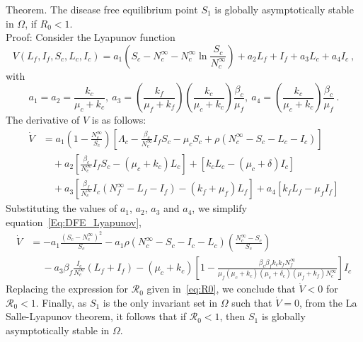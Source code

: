 \documentclass[preprint,12pt]{elsarticle}
\begin{document}
\noindent Theorem. The disease free equilibrium point $S_1$ is globally asymptotically stable in $\Omega$, if $R_0<1$.\\
Proof: Consider the Lyapunov function
$$V(L_f,I_f,S_c,L_c,I_c) = a_1\left(S_c - N_{c}^{\infty} - N_{c}^{\infty}\ln{\frac{S_c}{N_{c}^{\infty}}}\right) + a_2 L_f + I_f + a_3 L_c + a_4 I_c~,$$
with
$$
a_1 = a_2 = \frac{k_c}{\mu_c + k_c},\ a_3 = \left(\frac{k_f}{\mu_f + k_f}\right)\left(\frac{k_c}{\mu_c + k_c}\right)\frac{\beta_c}{\mu_f},\ a_4 = \left(\frac{k_c}{\mu_c + k_c}\right)\frac{\beta_c}{\mu_f}~.
$$
The derivative of $V$ is as follows:
\begin{equation}\label{Eq:DFE_Lyapunov}
    \begin{aligned}
    \dot{V} &= a_1\left(1 - \frac{N_{c}^{\infty}}{S_c}\right)\left[\Lambda_c-\frac{\beta_c}{N_c^{\infty}}I_fS_c-\mu_cS_c+\rho \left(N_c^{\infty} - S_c - L_c - I_c\right)\right]\\
    &\quad + a_2 \left[\frac{\beta_c}{N_c^{\infty}}I_fS_c-\left(\mu_c+k_c\right)L_c\right] + \left[k_c L_c-\left(\mu_c +\delta\right)I_c\right]\\
    &\quad + a_3\left[\frac{\beta_f}{N_c^{\infty}}I_c\left(N_f^{\infty} - L_f - I_f\right)-\left(k_f+\mu_f\right)L_f\right] + a_4 \left[k_f L_f-\mu_f I_f \right]
    \end{aligned}
\end{equation}
Substituting the values of $a_1$, $a_2$, $a_3$ and $a_4$, we simplify equation~\ref{Eq:DFE_Lyapunov},
\begin{equation*}
    \begin{aligned}
    \dot{V} &= -a_1\frac{\left(S_c - N_{c}^{\infty}\right)^{2}}{S_c} - a_1\rho\left(N_{c}^{\infty} - S_c - I_c - L_c\right)\left(\frac{N_{c}^{\infty} - S_c}{S_c}\right)\\
    &\quad\ - a_3\beta_f\frac{I_c}{N_{c}^{\infty}}\left(L_f + I_f\right) - \left(\mu_c + k_c\right)\left[1 - \frac{\beta_c\beta_f k_c k_fN_f^{\infty}}{\mu_f(\mu_c+k_c)(\mu_c+\delta_c)(\mu_f+k_f)N_c^{\infty}}\right]I_c
    \end{aligned}
\end{equation*}
Replacing the expression for $\mathcal{R}_{0}$ given in~\eqref{eq:R0}, we conclude that $\dot{V} < 0$ for $\mathcal{R}_{0} < 1$. Finally, as $S_{1}$ is the only invariant set in $\Omega$ such that $\dot{V}=0$, from the La Salle-Lyapunov theorem, it follows that if $\mathcal{R}_{0} < 1$, then $S_{1}$ is globally asymptotically stable in $\Omega$.
\end{document}
